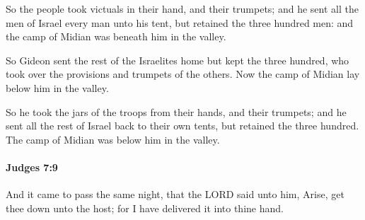 			\begin{versebox}
					\item[BHS] 
					\item[ASV] So the people took victuals in their hand, and their trumpets; and he sent all the men of Israel every man unto his tent, but retained the three hundred men: and the camp of Midian was beneath him in the valley.
					\item[NIV] So Gideon sent the rest of the Israelites home but kept the three hundred, who took over the provisions and trumpets of the others. Now the camp of Midian lay below him in the valley.
					\item[NRSV] So he took the jars of the troops from their hands, and their trumpets; and he sent all the rest of Israel back to their own tents, but retained the three hundred. The camp of Midian was below him in the valley.
			\end{versebox}

		\paragraph{Judges 7:9} %
			\label{JUDGES-7-9}

			And it came to pass the same night, that the LORD said unto him, Arise, get thee down unto the host; for I have delivered it into thine hand.

